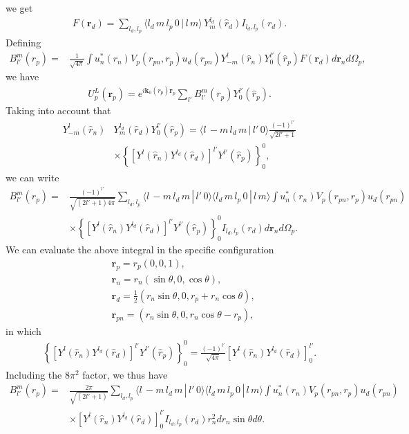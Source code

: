 \documentclass[a4paper,11pt]{article}
\begin{document}
 we get
 \begin{align}\label{eq75}
 F(\mathbf r_d)=\sum_{l_d,l_p} \langle l_d\,m\,l_p\,0\,|\,l\,m\rangle\,Y^{l_d}_m(\hat r_d)I_{l_d,l_p}(r_d).
 \end{align} 
 Defining
 \begin{align}\label{eq54}
  B_{l'}^m(r_p)=
 &\frac{1}{\sqrt{4\pi}}\int u_n^*(r_n)V_p(r_{pn},r_p)u_d(r_{pn})  Y^{l}_{-m}(\hat r_n)Y^{l'}_0(\hat r_p)F(\mathbf r_d) d\mathbf r_nd\Omega_p,
 \end{align} 
 we have
 \begin{align}\label{eq53}
  U^L_p(\mathbf r_p)=e^{i\mathbf k_0(r_p)\mathbf r_p}\sum_{l'}B^m_{l'}(r_p)Y_0^{l'}(\hat r_p).
 \end{align}
 Taking into account that
  \begin{align}\label{eq76}
 \nonumber Y^{l}_{-m}(\hat r_n)&Y^{l_d}_m(\hat r_d)Y^{l'}_0(\hat r_p)=\langle l\,-m\,l_d\,m\,|\,l'\,0\rangle\frac{(-1)^{l'}}{\sqrt{2l'+1}}\\
 &\times\left\{\left[Y^{l}(\hat r_n)Y^{l_d}(\hat r_d)\right]^{l'}Y^{l'}(\hat r_p)\right\}^0_0,
  \end{align}
we can write
 \begin{align}\label{eq55}
 \nonumber  B_{l'}^m(r_p)=&\frac{(-1)^{l'}}{\sqrt{(2l'+1)4\pi}}\sum_{l_d,l_p}\langle l\,-m\,l_d\,m\,|\,l'\,0\rangle\langle l_d\,m\,l_p\,0\,|\,l\,m\rangle\int u_n^*(r_n)V_p(r_{pn},r_p)u_d(r_{pn})\\
 &\times  \left\{\left[Y^{l}(\hat r_n)Y^{l_d}(\hat r_d)\right]^{l'}Y^{l'}(\hat r_p)\right\}^0_0 I_{l_d,l_p}(r_d)d\mathbf r_nd\Omega_p.
 \end{align}
 We can evaluate the above integral in the specific configuration
 \begin{align}\label{eq77}
 \nonumber&\mathbf r_p=r_p\left(0,0,1\right),\\
 \nonumber&\mathbf r_{n}=r_{n}\left(\sin\theta,0,\cos\theta\right),\\
 \nonumber &\mathbf r_{d}=\frac{1}{2}\left(r_{n}\sin\theta,0,r_p+r_{n}\cos\theta\right),\\
&\mathbf r_{pn}=\left(r_{n}\sin\theta,0,r_{n}\cos\theta-r_p\right),
 \end{align}
 in which
 \begin{align}\label{eq78}
  \left\{\left[Y^{l}(\hat r_n)Y^{l_d}(\hat r_d)\right]^{l'}Y^{l'}(\hat r_p)\right\}^0_0=\frac{(-1)^{l'}}{\sqrt{4\pi}}\left[Y^{l}(\hat r_n)Y^{l_d}(\hat r_d)\right]^{l'}_0.
 \end{align}
 Including the $8\pi^2$ factor, we thus have 
  \begin{align}\label{eq56}
  \nonumber B^m_{l'}(r_p)=&\frac{2\pi}{\sqrt{(2l'+1)}}\sum_{l_d,l_p}\langle l\,-m\,l_d\,m\,|\,l'\,0\rangle\langle l_d\,m\,l_p\,0\,|\,l\,m\rangle\int u_n^*(r_n)V_p(r_{pn},r_p)u_d(r_{pn})\\
  &\times  \left[Y^{l}(\hat r_n)Y^{l_d}(\hat r_d)\right]^{l'}_0 I_{l_d,l_p}(r_d)r^2_n d r_n \sin\theta d\theta.
  \end{align}
\end{document}
